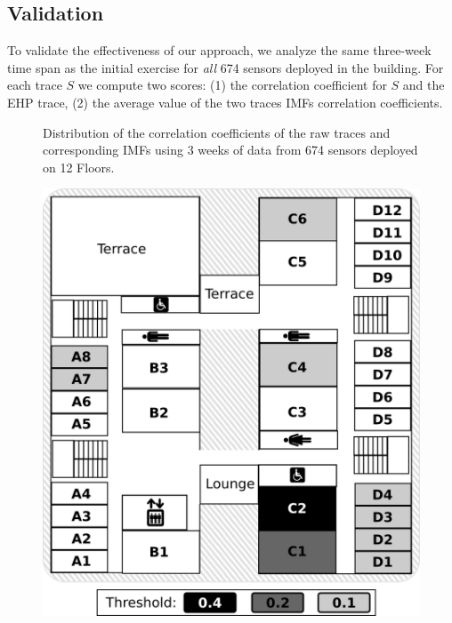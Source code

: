 \subsection{Validation}
To validate the effectiveness of our approach, we analyze the same three-week time span as the
initial exercise for \emph{all} 674 sensors deployed in the building.
For each trace $S$ we compute two scores: (1) the correlation coefficient for $S$ and the EHP trace, (2) the average value of the two traces IMFs correlation coefficients.

\begin{figure}[tbh!]
\centering
 \caption{Distribution of the correlation coefficients of the raw traces and corresponding IMFs using 3 weeks of data from 674 sensors deployed on 12 Floors.}
\label{fig:histo}
\end{figure}

\begin{figure} [h!]
\includegraphics[width=.5\textwidth]{img/floorMap.png}
\caption{}
\label{fig:map}
\end{figure}

